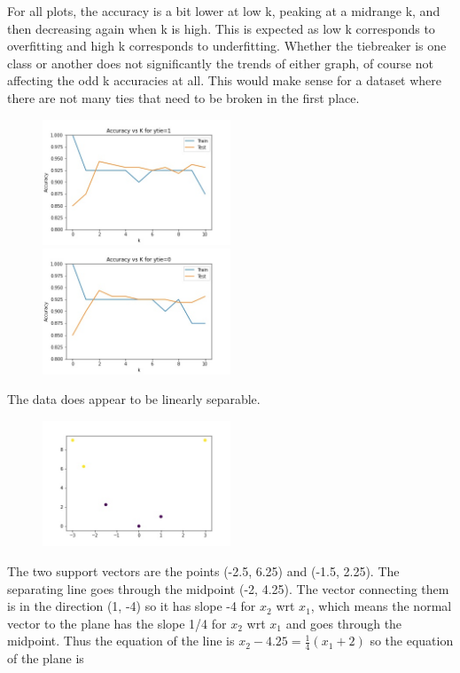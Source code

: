 \documentclass[newpage]{homework}
\begin{document}
\maketitle


\question
For all plots, the accuracy is a bit lower at low k, peaking at a midrange k, and then decreasing again when k is high. This is expected as low k corresponds to overfitting and high k corresponds to underfitting. Whether the tiebreaker is one class or another does not significantly the trends of either graph, of course not affecting the odd k accuracies at all. This would make sense for a dataset where there are not many ties that need to be broken in the first place.
\begin{figure}[htbp]
    \includegraphics[width=0.5\textwidth]{1a.jpg}
    \includegraphics[width=0.5\textwidth]{1b.jpg}
\end{figure}


\question
The data does appear to be linearly separable.
\begin{figure}[htbp]
    \centering
    \includegraphics[width=0.5\textwidth]{2a.jpg}
\end{figure}

The two support vectors are the points (-2.5, 6.25) and (-1.5, 2.25). The separating line goes through the midpoint (-2, 4.25). The vector connecting them is in the direction (1, -4) so it has slope -4 for $x_2$ wrt $x_1$, which means the normal vector to the plane has the slope 1/4 for $x_2$ wrt $x_1$ and goes through the midpoint. Thus the equation of the line is $x_2 - 4.25 = \frac{1}{4} (x_1 + 2)$ so the equation of the plane is 
\end{document}

